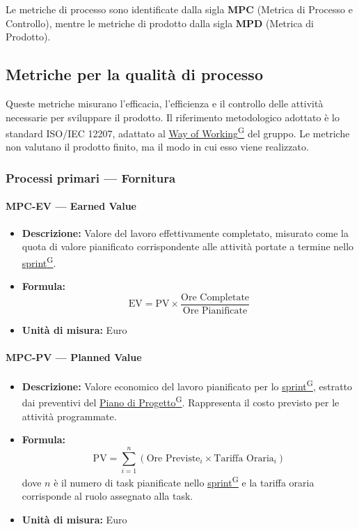 \documentclass[a4paper,12pt]{article}
\providecommand{\glslink}[2]{\href{https://alittlebyte-19.github.io/Documentazione/glossario.html\#gls-#1}{\underline{#2}\textsuperscript{\scriptsize G}}}
\begin{document}
Le metriche di processo sono identificate dalla sigla \textbf{MPC} (Metrica di Processo e Controllo), mentre le metriche di prodotto dalla sigla \textbf{MPD} (Metrica di Prodotto).

\subsection{Metriche per la qualità di processo}
Queste metriche misurano l'efficacia, l'efficienza e il controllo delle attività necessarie per sviluppare il prodotto. Il riferimento metodologico adottato è lo standard ISO/IEC 12207, adattato al \glslink{way-of-working-wow}{Way of Working} del gruppo. Le metriche non valutano il prodotto finito, ma il modo in cui esso viene realizzato.

\subsubsection{Processi primari --- Fornitura}

\paragraph{MPC-EV --- Earned Value}
\begin{itemize}
    \item \textbf{Descrizione:} Valore del lavoro effettivamente completato, misurato come la quota di valore pianificato corrispondente alle attività portate a termine nello \glslink{sprint}{sprint}.
    \item \textbf{Formula:}
    $$\text{EV} = \text{PV} \times \frac{\text{Ore Completate}}{\text{Ore Pianificate}}$$
    \item \textbf{Unità di misura:} Euro
\end{itemize}

\paragraph{MPC-PV --- Planned Value}
\begin{itemize}
    \item \textbf{Descrizione:} Valore economico del lavoro pianificato per lo \glslink{sprint}{sprint}, estratto dai preventivi del \glslink{piano-di-progetto}{Piano di Progetto}. Rappresenta il costo previsto per le attività programmate.
    \item \textbf{Formula:}
    $$\text{PV} = \sum_{i=1}^{n} (\text{Ore Previste}_i \times \text{Tariffa Oraria}_i)$$
    dove $n$ è il numero di task pianificate nello \glslink{sprint}{sprint} e la tariffa oraria corrisponde al ruolo assegnato alla task.
    \item \textbf{Unità di misura:} Euro
\end{itemize}
\end{document}
